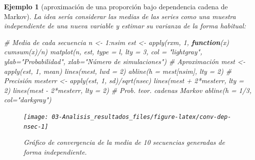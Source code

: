 \documentclass[
]{book}
\newenvironment{Shaded}{\begin{snugshade}}{\end{snugshade}}
\newcommand{\AttributeTok}[1]{\textcolor[rgb]{0.77,0.63,0.00}{#1}}
\newcommand{\CommentTok}[1]{\textcolor[rgb]{0.56,0.35,0.01}{\textit{#1}}}
\newcommand{\ControlFlowTok}[1]{\textcolor[rgb]{0.13,0.29,0.53}{\textbf{#1}}}
\newcommand{\DecValTok}[1]{\textcolor[rgb]{0.00,0.00,0.81}{#1}}
\newcommand{\FunctionTok}[1]{\textcolor[rgb]{0.00,0.00,0.00}{#1}}
\newcommand{\NormalTok}[1]{#1}
\newcommand{\OtherTok}[1]{\textcolor[rgb]{0.56,0.35,0.01}{#1}}
\newcommand{\SpecialCharTok}[1]{\textcolor[rgb]{0.00,0.00,0.00}{#1}}
\newcommand{\StringTok}[1]{\textcolor[rgb]{0.31,0.60,0.02}{#1}}
\theoremstyle{break}
\newtheorem{example}{Ejemplo}[chapter]
\theoremstyle{nonumberplain}
\begin{document}
\begin{example}[aproximación de una proporción bajo dependencia cadena de Markov]
La idea sería considerar las medias de las series como una muestra independiente de una nueva variable y estimar su varianza de la forma habitual:

\begin{Shaded}
\begin{Highlighting}[]
\CommentTok{\# Media de cada secuencia}
\NormalTok{n }\OtherTok{\textless{}{-}} \DecValTok{1}\SpecialCharTok{:}\NormalTok{nsim}
\NormalTok{est }\OtherTok{\textless{}{-}} \FunctionTok{apply}\NormalTok{(rxm, }\DecValTok{1}\NormalTok{, }\ControlFlowTok{function}\NormalTok{(x) }\FunctionTok{cumsum}\NormalTok{(x)}\SpecialCharTok{/}\NormalTok{n)}
\FunctionTok{matplot}\NormalTok{(n, est, }\AttributeTok{type =} \StringTok{\textquotesingle{}l\textquotesingle{}}\NormalTok{, }\AttributeTok{lty =} \DecValTok{3}\NormalTok{, }\AttributeTok{col =} \StringTok{"lightgray"}\NormalTok{,}
     \AttributeTok{ylab=}\StringTok{"Probabilidad"}\NormalTok{, }\AttributeTok{xlab=}\StringTok{"Número de simulaciones"}\NormalTok{)}
\CommentTok{\# Aproximación}
\NormalTok{mest }\OtherTok{\textless{}{-}} \FunctionTok{apply}\NormalTok{(est, }\DecValTok{1}\NormalTok{, mean)}
\FunctionTok{lines}\NormalTok{(mest, }\AttributeTok{lwd =} \DecValTok{2}\NormalTok{)}
\FunctionTok{abline}\NormalTok{(}\AttributeTok{h =}\NormalTok{ mest[nsim], }\AttributeTok{lty =} \DecValTok{2}\NormalTok{)}
\CommentTok{\# Precisión}
\NormalTok{mesterr }\OtherTok{\textless{}{-}} \FunctionTok{apply}\NormalTok{(est, }\DecValTok{1}\NormalTok{, sd)}\SpecialCharTok{/}\FunctionTok{sqrt}\NormalTok{(nsec)}
\FunctionTok{lines}\NormalTok{(mest }\SpecialCharTok{+} \DecValTok{2}\SpecialCharTok{*}\NormalTok{mesterr, }\AttributeTok{lty =} \DecValTok{2}\NormalTok{)}
\FunctionTok{lines}\NormalTok{(mest }\SpecialCharTok{{-}} \DecValTok{2}\SpecialCharTok{*}\NormalTok{mesterr, }\AttributeTok{lty =} \DecValTok{2}\NormalTok{)}
\CommentTok{\# Prob. teor. cadenas Markov}
\FunctionTok{abline}\NormalTok{(}\AttributeTok{h =} \DecValTok{1}\SpecialCharTok{/}\DecValTok{3}\NormalTok{, }\AttributeTok{col=}\StringTok{"darkgray"}\NormalTok{)     }
\end{Highlighting}
\end{Shaded}

\begin{figure}[!htb]

{\centering \texttt{[image: 03-Analisis\_resultados\_files/figure-latex/conv-dep-nsec-1]} 

}

\caption{Gráfico de convergencia de la media de 10 secuencias generadas de forma independiente.}\label{fig:conv-dep-nsec}
\end{figure}


\end{example}
\end{document}
